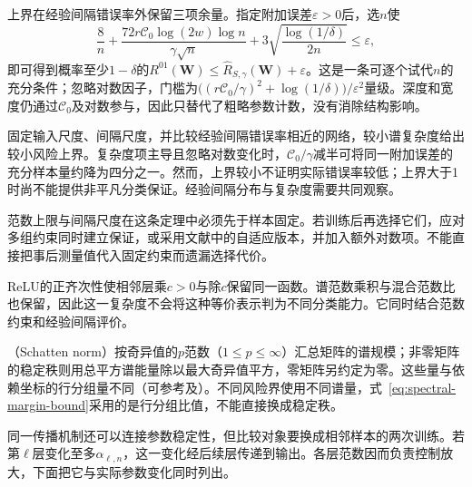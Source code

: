 上界在经验间隔错误率外保留三项余量。指定附加误差$\varepsilon>0$后，选$n$使
\[
 \frac8n+\frac{72r\mathcal C_0\log(2w)\log n}{\gamma\sqrt n}
 +3\sqrt{\frac{\log(1/\delta)}{2n}}\leq\varepsilon,
\]
即可得到概率至少$1-\delta$的$R^{01}(\bm W)\leq\hat R_{S,\gamma}(\bm W)+\varepsilon$。这是一条可逐个试代$n$的充分条件；忽略对数因子，门槛为$\bigl((r\mathcal C_0/\gamma)^2+\log(1/\delta)\bigr)/\varepsilon^2$量级。深度和宽度仍通过$\mathcal C_0$及对数参与，因此只替代了粗略参数计数，没有消除结构影响。

固定输入尺度、间隔尺度，并比较经验间隔错误率相近的网络，较小谱复杂度给出较小风险上界。复杂度项主导且忽略对数变化时，$\mathcal C_0/\gamma$减半可将同一附加误差的充分样本量约降为四分之一。然而，上界较小不证明实际错误率较低；上界大于1时尚不能提供非平凡分类保证。经验间隔分布与复杂度需要共同观察。

范数上限与间隔尺度在这条定理中必须先于样本固定。若训练后再选择它们，应对多组约束同时建立保证，或采用文献中的自适应版本，并加入额外对数项。不能直接把事后测量值代入固定约束而遗漏选择代价。

ReLU的正齐次性使相邻层乘$c>0$与除$c$保留同一函数。谱范数乘积与混合范数比也保留，因此这一复杂度不会将这种等价表示判为不同分类能力。它同时结合范数约束和经验间隔评价。

（Schatten norm）按奇异值的$p$范数（$1\leq p\leq\infty$）汇总矩阵的谱规模；非零矩阵的稳定秩则用总平方谱能量除以最大奇异值平方，零矩阵另约定为零。这些量与依赖坐标的行分组量不同（可参考及）。不同风险界使用不同谱量，式~\eqref{eq:spectral-margin-bound}采用的是行分组比值，不能直接换成稳定秩。

同一传播机制还可以连接参数稳定性，但比较对象要换成相邻样本的两次训练。若第$\ell$层变化至多$\alpha_{\ell,n}$，这一变化经后续层传递到输出。各层范数因而负责控制放大，下面把它与实际参数变化同时列出。

